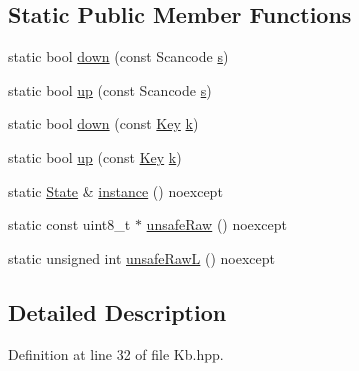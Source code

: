 \subsection*{Static Public Member Functions}
\begin{DoxyCompactItemize}
\item 
static bool \mbox{\hyperlink{classrolmodl_1_1rolmodl_1_1kb_1_1_state_a9ab83147f82ef50d0407fd0fb6115ce3}{down}} (const Scancode \mbox{\hyperlink{namespacerolmodl_1_1rolmodl_1_1kb_a188e00b289aeb95ae45fb6bf2923e7e2a03c7c0ace395d80182db07ae2c30f034}{s}})
\item 
static bool \mbox{\hyperlink{classrolmodl_1_1rolmodl_1_1kb_1_1_state_a46c1389b6ef3ee77b3bbf71a5ac19849}{up}} (const Scancode \mbox{\hyperlink{namespacerolmodl_1_1rolmodl_1_1kb_a188e00b289aeb95ae45fb6bf2923e7e2a03c7c0ace395d80182db07ae2c30f034}{s}})
\item 
static bool \mbox{\hyperlink{classrolmodl_1_1rolmodl_1_1kb_1_1_state_aeddbb8cc9b74da6ea1eb5f0d6a6cb717}{down}} (const \mbox{\hyperlink{namespacerolmodl_1_1rolmodl_1_1kb_a188e00b289aeb95ae45fb6bf2923e7e2}{Key}} \mbox{\hyperlink{namespacerolmodl_1_1rolmodl_1_1kb_a188e00b289aeb95ae45fb6bf2923e7e2a8ce4b16b22b58894aa86c421e8759df3}{k}})
\item 
static bool \mbox{\hyperlink{classrolmodl_1_1rolmodl_1_1kb_1_1_state_ad8aeacf2208af68e2336fa17375e6ce4}{up}} (const \mbox{\hyperlink{namespacerolmodl_1_1rolmodl_1_1kb_a188e00b289aeb95ae45fb6bf2923e7e2}{Key}} \mbox{\hyperlink{namespacerolmodl_1_1rolmodl_1_1kb_a188e00b289aeb95ae45fb6bf2923e7e2a8ce4b16b22b58894aa86c421e8759df3}{k}})
\item 
static \mbox{\hyperlink{classrolmodl_1_1rolmodl_1_1kb_1_1_state}{State}} \& \mbox{\hyperlink{classrolmodl_1_1rolmodl_1_1kb_1_1_state_a4cf4d939c14e12204f27a7cd34a13f61}{instance}} () noexcept
\item 
static const uint8\+\_\+t $\ast$ \mbox{\hyperlink{classrolmodl_1_1rolmodl_1_1kb_1_1_state_a471f44fef811cb19ded3040777d1c9fc}{unsafe\+Raw}} () noexcept
\item 
static unsigned int \mbox{\hyperlink{classrolmodl_1_1rolmodl_1_1kb_1_1_state_a9d75c27364e30390190fae9aa40e72f9}{unsafe\+RawL}} () noexcept
\end{DoxyCompactItemize}


\subsection{Detailed Description}


Definition at line 32 of file Kb.\+hpp.




